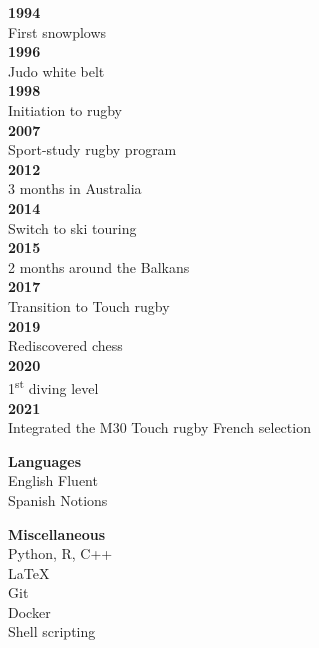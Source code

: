 \documentclass{article}
\begin{document}
\begin{minipage}{0.15\textwidth}
    \begin{minipage}{1\textwidth}
    \begin{flushleft}
        \textbf{1994} \\
        First snowplows \\[.2cm]
        \textbf{1996} \\
        Judo white belt \\[.2cm]
        \textbf{1998} \\
        Initiation to rugby \\[.9cm]
        \textbf{2007} \\
        Sport-study rugby program \\[.5cm]
        \textbf{2012} \\
        3 months in Australia \\[.2cm]
        \textbf{2014} \\
        Switch to ski touring \\[.1cm]
        \textbf{2015} \\
        2 months around the Balkans \\[.2cm]
        \textbf{2017} \\
        Transition to Touch rugby \\[.2cm]
        \textbf{2019} \\
        Rediscovered chess \\[.1cm]
        \textbf{2020} \\
        1\textsuperscript{st} diving level \\[.1cm]
        \textbf{2021} \\
        Integrated the M30 Touch rugby French selection
    \end{flushleft}
    \end{minipage}
    \begin{minipage}{1\textwidth}
    \vspace{8.6cm}
    \begin{flushleft}
        \textbf{Languages} \\[.1cm]
        English \quad Fluent \\
        Spanish \quad Notions
    \end{flushleft}
    \end{minipage}
    \begin{minipage}{1\textwidth}
    \vspace{1cm}
    \begin{flushleft}
        \textbf{Miscellaneous} \\[.1cm]
        Python, R, C++ \\
        \LaTeX \\
        Git \\
        Docker \\
        Shell scripting
    \end{flushleft}
    \end{minipage}
\end{minipage}
\end{document}
